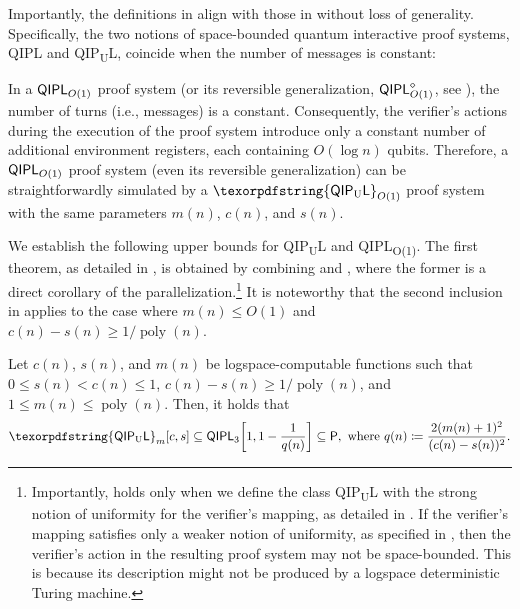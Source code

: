 \documentclass[10pt,a4paper]{article}
\numberwithin{equation}{section}
\numberwithin{figure}{section}
\newcommand{\Ptime}{\textnormal{\textsf{P}}\xspace}
\newcommand{\QIPL}{\textnormal{\textsf{QIPL}}\xspace}
\newcommand{\QIPLconst}{\texorpdfstring{\textnormal{\textsf{QIPL}\textsubscript{O(1)}}}\xspace}
\newcommand{\QIPUL}{\texorpdfstring{\textnormal{\textsf{QIP}\textsubscript{\textnormal{U}}\textsf{L}}}\xspace}
\DeclarePairedDelimiter\sbra{\lbrack}{\rbrack}
\DeclareMathOperator\poly{poly}
\begin{document}
Importantly, the definitions in  align with those in  without loss of generality. Specifically, the two notions of space-bounded quantum interactive proof systems, \QIPL{} and \QIPUL{}, coincide when the number of messages is constant:
\begin{remark}[The equivalence of $\QIPL_{O(1)}$ and $\QIPUL_{O(1)}$]
    \label{remark:QIPLconst-welldefined}
    In a $\QIPL_{O(1)}$ proof system (or its reversible generalization, $\QIPL^{\diamond}_{O(1)}$, see ), the number of turns (i.e., messages) is a constant. Consequently, the verifier's actions during the execution of the proof system introduce only a constant number of additional environment registers, each containing $O(\log{n})$ qubits. Therefore, a $\QIPL_{O(1)}$ proof system (even its reversible generalization) can be straightforwardly simulated by a $\QIPUL_{O(1)}$ proof system with the same parameters $m(n)$, $c(n)$, and $s(n)$. 
\end{remark}

\vspace{1em}
We establish the following upper bounds for \QIPUL{} and \QIPLconst{}. 
The first theorem, as detailed in , is obtained by combining  and , where the former is a direct corollary of the parallelization.\footnote{Importantly,  holds only when we define the class \QIPUL{} with the strong notion of uniformity for the verifier's mapping, as detailed in . If the verifier's mapping satisfies only a weaker notion of uniformity, as specified in , then the verifier's action in the resulting proof system may not be space-bounded. This is because its description might not be produced by a logspace deterministic Turing machine.\label{footref:QIPL-uniformity-in-parallelization}} It is noteworthy that the second inclusion in  applies to the case where $m(n) \leq O(1)$ and $c(n) - s(n) \geq 1/\poly(n)$. 


\begin{theorem}[$\QIPUL \subseteq \Ptime$]
    \label{thm:QIPUL-in-P}
    Let $c(n)$, $s(n)$, and $m(n)$ be logspace-computable functions such that $0 \leq s(n) < c(n) \leq 1$, $c(n) \!-\! s(n) \geq 1/\poly(n)$, and $1 \leq m(n) \leq \poly(n)$. Then, it holds that
    \[ \QIPUL_m[c,s] \subseteq \QIPL_3\sbra*{1,1-\frac{1}{q(n)}} \subseteq \Ptime, \text{ where } q(n) \coloneqq \frac{2(m(n)+1)^2}{(c(n) - s(n))^2}. \]
\end{theorem}
\end{document}
